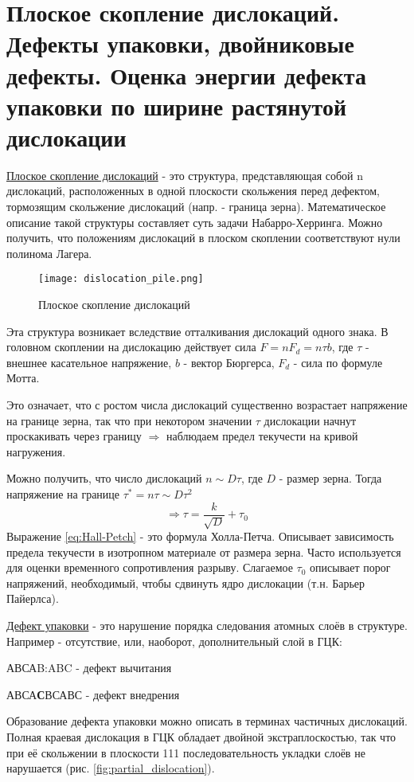 \section{Плоское скопление дислокаций. Дефекты упаковки, двойниковые дефекты.
Оценка энергии дефекта упаковки по ширине растянутой дислокации}
\underline{Плоское скопление дислокаций} - это структура, представляющая собой n дислокаций, расположенных в одной плоскости скольжения перед дефектом, тормозящим скольжение дислокаций (напр. - граница зерна). Математическое описание такой структуры составляет суть задачи Набарро-Херринга. Можно получить, что положениям дислокаций в плоском скоплении соответствуют нули полинома Лагера. 
\begin{figure}[h!]
\centering
\texttt{[image: dislocation\_pile.png]}\caption{Плоское скопление дислокаций}\label{fig:dislocation_pile}
\end{figure} 
\par Эта структура возникает вследствие отталкивания дислокаций одного знака. В головном скоплении на дислокацию действует сила $F=nF_d=n\tau b$, где $\tau$ - внешнее касательное напряжение, $b$ - вектор Бюргерса, $F_d$ - сила по формуле Мотта. \par
Это означает, что с ростом числа дислокаций существенно возрастает напряжение на границе зерна, так что при некотором значении $\tau$ дислокации начнут проскакивать через границу $\Rightarrow$ наблюдаем предел текучести на кривой нагружения. \par 
Можно получить, что число дислокаций $n\sim D \tau$, где $D$ - размер зерна. Тогда напряжение на границе $\tau^* = n\tau \sim D\tau^2$
\begin{equation}
  \Rightarrow \tau = \frac{k}{\sqrt{D}}+\tau_0
\label{eq:Hall-Petch} 
\end{equation}
Выражение \ref{eq:Hall-Petch} - это формула Холла-Петча. Описывает зависимость предела текучести в изотропном материале от размера зерна. Часто используется для оценки временного сопротивления разрыву. Слагаемое $\tau_0$ описывает порог напряжений, необходимый, чтобы сдвинуть ядро дислокации (т.н. Барьер Пайерлса).
\par
\underline{Дефект упаковки} - это нарушение порядка следования атомных слоёв в структуре. Например - отсутствие, или, наоборот, дополнительный слой в ГЦК: \par АВСАB:ABC - дефект вычитания 
\par АВСА\textbf{С}ВСАВС - дефект внедрения
\par Образование дефекта упаковки можно описать в терминах частичных дислокаций. Полная краевая дислокация в ГЦК обладает двойной экстраплоскостью, так что при её скольжении в плоскости {111} последовательность укладки слоёв не нарушается (рис. \ref{fig:partial_dislocation}). 
